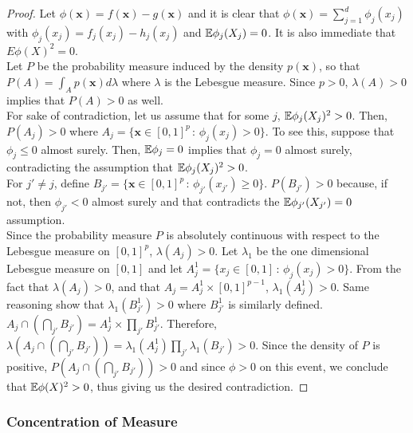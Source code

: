 \begin{proof}

Let $\phi(\mathbf{x}) = f(\mathbf{x}) - g(\mathbf{x})$ and it is clear that $\phi(\mathbf{x}) = \sum_{j=1}^d \phi_j(x_j)$ with $\phi_j(x_j) = f_j(x_j) - h_j(x_j)$ and ${\mathbb E} \phi_j(X_j) = 0$. It is also immediate that $E \phi(X)^2 = 0$. \\

Let $P$ be the probability measure induced by the density $p(\mathbf{x})$, so that $P(A) = \int_A p(\mathbf{x}) d\lambda$ where $\lambda$ is the Lebesgue measure. Since $p > 0$, $\lambda(A) > 0$ implies that $P(A) > 0$ as well. \\

For sake of contradiction, let us assume that for some $j$, ${\mathbb E} \phi_j(X_j)^2 > 0$. Then, $P(A_j ) > 0$ where $A_j = \{ \mathbf{x} \in [0,1]^p \,:\, \phi_j(x_j) > 0 \}$. To see this, suppose that $\phi_j \leq 0$ almost surely. Then, ${\mathbb E} \phi_j = 0$ implies that $\phi_j = 0$ almost surely, contradicting the assumption that ${\mathbb E} \phi_j(X_j)^2 > 0$.\\

For $j' \neq j$, define $B_{j'} = \{ \mathbf{x} \in [0,1]^p \,:\, \phi_{j'}(x_{j'}) \geq 0 \}$. $P( B_{j'} ) > 0$ because, if not, then $\phi_{j'} < 0$ almost surely and that contradicts the ${\mathbb E} \phi_{j'}(X_{j'}) = 0$ assumption. \\

Since the probability measure $P$ is absolutely continuous with respect to the Lebesgue measure on $[0, 1]^p$, $\lambda (A_j) > 0$. Let $\lambda_1$ be the one dimensional Lebesgue measure on $[0,1]$ and let $A^1_j = \{ x_j \in [0,1] \,:\, \phi_j(x_j) > 0\}$. From the fact that $\lambda(A_j) > 0$, and that $A_j = A^1_j \times [0,1]^{p-1}$, $\lambda_1(A^1_j) > 0$. Same reasoning show that $\lambda_1(B^1_{j'}) > 0$ where $B^1_{j'}$ is similarly defined.\\

$A_j \cap \left( \bigcap_{j'} B_{j'} \right) = A^1_j \times \prod_{j'} B^1_{j'}$. Therefore, $\lambda ( A_j \cap \left( \bigcap_{j'} B_{j'} \right) ) = \lambda_1(A^1_j)  \prod_{j'} \lambda_1 (B_{j'}) > 0$. Since the density of $P$ is positive, $P( A_j \cap \left( \bigcap_{j'} B_{j'} \right) ) > 0$ and since $\phi > 0$ on this event, we conclude that ${\mathbb E} \phi(X)^2 > 0$, thus giving us the desired contradiction.

\end{proof}

\subsubsection{Concentration of Measure}

